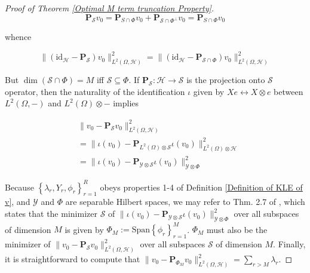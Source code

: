 \documentclass{article}
\numberwithin{theorem}{section}
\numberwithin{lemma}{section}
\numberwithin{definition}{section}
\numberwithin{assumption}{section}
\numberwithin{proposition}{section}
\numberwithin{remark}{section}
\numberwithin{corollary}{section}
\numberwithin{conjecture}{section}
\numberwithin{example}{section}
\newcommand{\bset}[1]{\left \lbrace #1 \right \rbrace}
\newcommand{\Span}[1]{\mathrm{Span}\bset{#1}}
\newcommand{\id}{\mathrm{id}}
\newcommand{\D}{\displaystyle}
\newcommand{\CH}{\mathcal H}
\begin{document}
\begin{multicols*}{2}
\begin{proof}[Proof of Theorem \ref{Optimal M term truncation Property}]
	$$\mathbf P_\mathcal S v_0 = \mathbf P_{S \cap \Phi}v_0 + \mathbf P_{\mathcal S \cap \Phi^\perp}v_0 = \mathbf P_{S \cap \Phi}v_0$$
	
	whence 
	
	$$\|(\id_\CH - \mathbf P_\mathcal S)v_0 \|_{L^2(\Omega, \CH)}^2 = \|(\id_\CH - \mathbf P_{\mathcal S \cap \Phi})v_0 \|_{L^2(\Omega, \CH)}^2$$

	
	But $\dim(\mathcal S \cap \Phi) = M$ iff $\mathcal S \subseteq \Phi$.  If $\mathbf P_{\mathcal S}: \CH \to \mathcal S$ is the projection onto $\mathcal S$ operator, then the naturality of the identification $\iota$ given by $Xe \leftrightarrow X \otimes e$ between $L^2(\Omega, -)$ and $L^2(\Omega) \otimes -$ implies
	
	\begin{align*}
	&\|v_0 - \mathbf P_{\mathcal S} v_0\|^2_{L^2(\Omega, \CH)} 
	\\&= 
    \|\iota(v_0) - \mathbf P_{L^2(\Omega) \otimes \mathcal S} \iota(v_0)\|^2_{L^2(\Omega) \otimes \CH}
	\\&= 
	\|\iota(v_0) - \mathbf P_{\mathcal Y \otimes \mathcal S} \iota(v_0)\|^2_{\mathcal Y \otimes \Phi}
	\end{align*}

	
	
	 Because $\bset{\lambda_r, Y_r, \phi_r}_{r=1}^R$ obeys properties 1-4 of Definition \ref{Definition of KLE of v}, and $\mathcal Y$ and $\Phi$ are separable Hilbert spaces, we may refer to Thm. 2.7 of \cite{Schwab2006}, which states that the minimizer $\mathcal S$ of $\|\iota(v_0) - \mathbf P_{\mathcal Y \otimes \mathcal S} \iota(v_0)\|^2_{\mathcal Y \otimes \Phi}$ over all subspaces of dimension $M$ is given by $\Phi_M := \Span{\phi_r}_{r=1}^M$. $\Phi_M$ must also be the minimizer of $\|v_0 - \mathbf P_{\mathcal S} v_0\|^2_{L^2(\Omega, \CH)}$ over all subspaces $\mathcal S$ of dimension $M$. Finally, it is straightforward to compute that $	\|v_0 - \mathbf P_{\Phi_M} v_0\|^2_{L^2(\Omega, \CH)} = \D \sum_{r > M} \lambda_r$.
	
	
	
	
\end{proof}

\end{multicols*}
\end{document}
